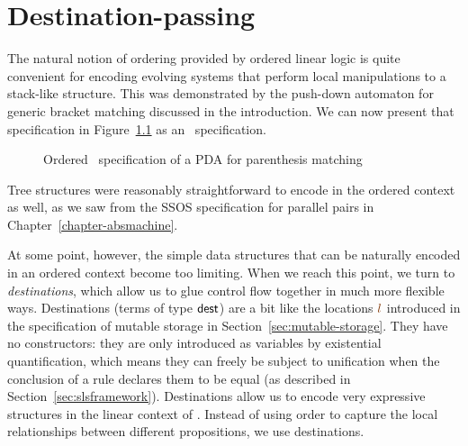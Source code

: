 \chapter{Destination-passing}
\label{chapter-destinations}

The natural notion of ordering provided by ordered linear logic is
quite convenient for encoding evolving systems that perform local
manipulations to a stack-like structure.  This was demonstrated
by the push-down
automaton for generic bracket matching discussed in the introduction.
We can now present that specification in
Figure~\ref{fig:pda-ord} as an \sls~specification.

\begin{figure}[ht]
\caption{Ordered \sls~specification of a PDA for parenthesis matching}
\label{fig:pda-ord}
\end{figure}

\noindent
Tree structures were reasonably straightforward to encode in the
ordered context as well, as we saw from the SSOS specification for
parallel pairs in Chapter~\ref{chapter-absmachine}. 

At some point, however, the simple data structures that can be
naturally encoded in an ordered context become too limiting. When we
reach this point, we turn to {\it destinations}, which allow us to
glue control flow together in much more flexible ways. Destinations
(terms of type ${\sf dest}$) are a bit like the locations $\lf l$
introduced in the specification of mutable storage in
Section~\ref{sec:mutable-storage}. They have no constructors: they are
only introduced as variables by existential quantification, which
means they can freely be subject to unification when the conclusion of
a rule declares them to be equal (as described in
Section~\ref{sec:slsframework}). Destinations allow us to encode very
expressive structures in the linear context of \sls. Instead of using
order to capture the local relationships between different
propositions, we use destinations.

